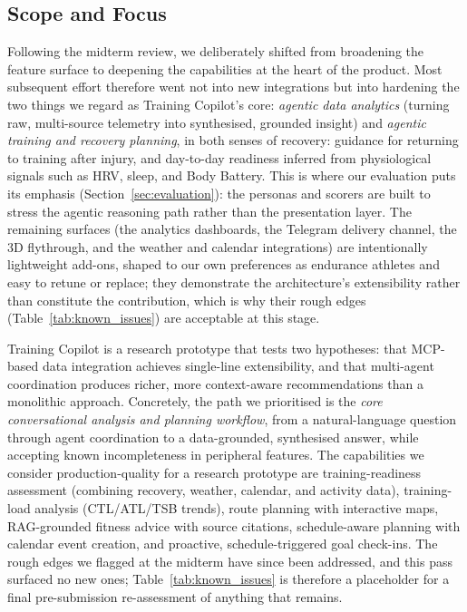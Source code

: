 \subsection{Scope and Focus}\label{sec:discussion:scope}

Following the midterm review, we deliberately shifted from broadening the feature surface to deepening the capabilities at the heart of the product. Most subsequent effort therefore went not into new integrations but into hardening the two things we regard as Training Copilot's core: \textit{agentic data analytics} (turning raw, multi-source telemetry into synthesised, grounded insight) and \textit{agentic training and recovery planning}, in both senses of recovery: guidance for returning to training after injury, and day-to-day readiness inferred from physiological signals such as HRV, sleep, and Body Battery. This is where our evaluation puts its emphasis (Section~\ref{sec:evaluation}): the personas and scorers are built to stress the agentic reasoning path rather than the presentation layer. The remaining surfaces (the analytics dashboards, the Telegram delivery channel, the 3D flythrough, and the weather and calendar integrations) are intentionally lightweight add-ons, shaped to our own preferences as endurance athletes and easy to retune or replace; they demonstrate the architecture's extensibility rather than constitute the contribution, which is why their rough edges (Table~\ref{tab:known_issues}) are acceptable at this stage.

Training Copilot is a research prototype that tests two hypotheses: that MCP-based data integration achieves single-line extensibility, and that multi-agent coordination produces richer, more context-aware recommendations than a monolithic approach. Concretely, the path we prioritised is the \textit{core conversational analysis and planning workflow}, from a natural-language question through agent coordination to a data-grounded, synthesised answer, while accepting known incompleteness in peripheral features. The capabilities we consider production-quality for a research prototype are training-readiness assessment (combining recovery, weather, calendar, and activity data), training-load analysis (CTL/ATL/TSB trends), route planning with interactive maps, RAG-grounded fitness advice with source citations, schedule-aware planning with calendar event creation, and proactive, schedule-triggered goal check-ins. The rough edges we flagged at the midterm have since been addressed, and this pass surfaced no new ones; Table~\ref{tab:known_issues} is therefore a placeholder for a final pre-submission re-assessment of anything that remains.


